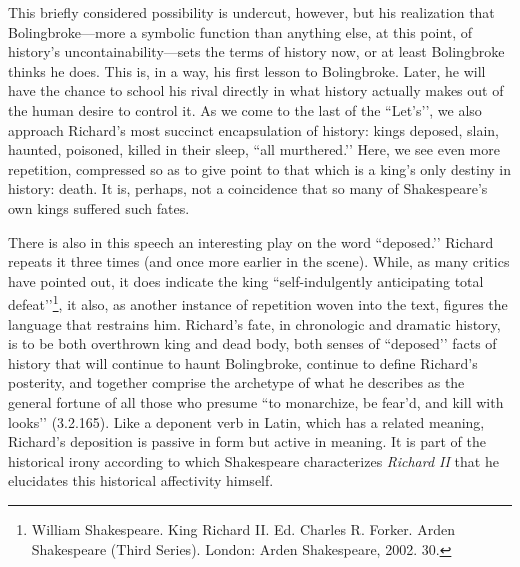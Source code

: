 This briefly considered possibility is undercut, however, but his realization that Bolingbroke---more a symbolic function than anything else, at this point, of history’s uncontainability---sets the terms of history now, or at least Bolingbroke thinks he does.
This is, in a way, his first lesson to Bolingbroke.
Later, he will have the chance to school his rival directly in what history actually makes out of the human desire to control it.
As we come to the last of the ``Let’s’’, we also approach Richard’s most succinct encapsulation of history: kings deposed, slain, haunted, poisoned, killed in their sleep, ``all murthered.’’ Here, we see even more repetition, compressed so as to give point to that which is a king’s only destiny in history: death.
It is, perhaps, not a coincidence that so many of Shakespeare’s own kings suffered such fates.

There is also in this speech an interesting play on the word ``deposed.’’ Richard repeats it three times (and once more earlier in the scene).
While, as many critics have pointed out, it does indicate the king ``self-indulgently anticipating total defeat’’\footnote{William Shakespeare. King Richard II. Ed. Charles R. Forker. Arden Shakespeare (Third Series). London: Arden Shakespeare, 2002. 30.}, it also, as another instance of repetition woven into the text, figures the language that restrains him.
Richard’s fate, in chronologic and dramatic history, is to be both overthrown king and dead body, both senses of ``deposed’’ facts of history that will continue to haunt Bolingbroke, continue to define Richard’s posterity, and together comprise the archetype of what he describes as the general fortune of all those who presume ``to monarchize, be fear’d, and kill with looks’’ (3.2.165).
Like a deponent verb in Latin, which has a related meaning, Richard’s deposition is passive in form but active in meaning.
It is part of the historical irony according to which Shakespeare characterizes \emph{Richard II} that he elucidates this historical affectivity himself.

